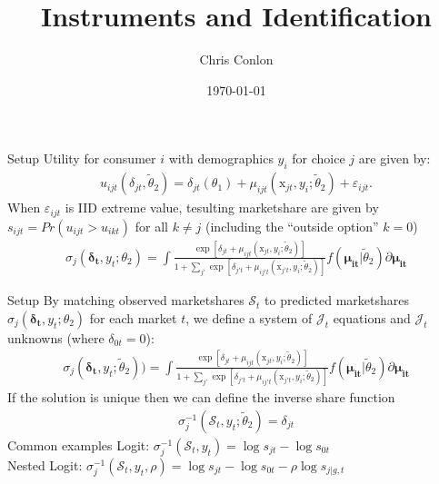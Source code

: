 \documentclass[xcolor=pdftex,dvipsnames,table,mathserif,aspectratio=169]{beamer}
\begin{document}
\title{Instruments and Identification }
\author{Chris Conlon}
\date{\today}

\frame{\titlepage}


\begin{frame}{Setup}
Utility for consumer $i$ with demographics $y_i$ for choice $j$ are given by:
\begin{align*}
\label{eq:utility}
u_{ijt}(\delta_{jt},\widetilde{\theta}_2) =  \delta_{jt}(\theta_1)  + \mu_{ijt}(\textrm{x}_{jt}, y_i; \widetilde{\theta}_2) + \varepsilon_{ijt}.
\end{align*}
When $\varepsilon_{ijt}$ is IID extreme value, tesulting marketshare are given by $s_{ijt} = Pr(u_{ijt}> u_{ikt})$ for all $k\neq j$ (including the ``outside option'' $k=0$)
\begin{align*}
\sigma_j(\boldsymbol{\delta_t},y_t;\theta_2)=\int \frac{\exp[\delta_{jt}+\mu_{ijt}(\textrm{x}_{jt}, y_i; \widetilde{\theta}_2)]}{1+\sum_{j'} \exp[\delta_{j't}+\mu_{ij't}(\textrm{x}_{j't}, y_i; \widetilde{\theta}_2)]}f(\boldsymbol{\mu_{it}}| \widetilde{\theta}_2) \partial \boldsymbol{\mu_{it}}
\end{align*}
\end{frame}


\begin{frame}{Setup}
By matching observed marketshares $\mathcal{S}_t$ to predicted marketshares $\sigma_j(\boldsymbol{\delta_t},y_t;\theta_2)$ for each market $t$, we define a system of $\mathcal{J}_t$ equations and $\mathcal{J}_t$ unknowns (where $\delta_{0t}=0$):
\begin{align*}
\sigma_j(\boldsymbol{\delta_t},y_t;\widetilde{\theta}_2))=\int \frac{\exp[\delta_{jt}+\mu_{ijt}(\textrm{x}_{jt}, y_i; \widetilde{\theta}_2)]}{1+\sum_{j'} \exp[\delta_{j't}+\mu_{ij't}(\textrm{x}_{j't}, y_i; \widetilde{\theta}_2)]}f(\boldsymbol{\mu_{it}} | \widetilde{\theta}_2) \partial \boldsymbol{\mu_{it}}
\end{align*}
If the solution is unique then we can define the \alert{inverse share function}
\begin{align*}
\sigma_j^{-1}(\mathcal{S}_t,y_t;\widetilde{\theta}_2)=\delta_{jt}
\end{align*}
Common examples Logit: $\sigma_j^{-1}(\mathcal{S}_t,y_t)=\log s_{jt}- \log s_{0t}$\\
Nested Logit: $\sigma_j^{-1}(\mathcal{S}_t,y_t, \rho)=\log s_{jt}- \log s_{0t}- \rho \log s_{j |g, t}$
\end{frame}
\end{document}
